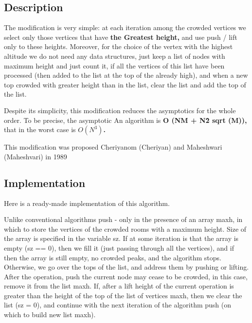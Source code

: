 \subsection{ Description }
The modification is very simple: at each iteration among the crowded vertices we select only those vertices that have \textbf{the Greatest height,} and use push / lift only to these heights. Moreover, for the choice of the vertex with the highest altitude we do not need any data structures, just keep a list of nodes with maximum height and just count it, if all the vertices of this list have been processed (then added to the list at the top of the already high), and when a new top crowded with greater height than in the list, clear the list and add the top of the list.

Despite its simplicity, this modification reduces the asymptotics for the whole order. To be precise, the asymptotic An algorithm is \textbf{O (NM + N\^2 sqrt (M)),} that in the worst case is \textbf{$O(N^3)$.}

This modification was proposed Cheriyanom (Cheriyan) and Maheshwari (Maheshvari) in 1989

\subsection{ Implementation }
Here is a ready-made implementation of this algorithm.

Unlike conventional algorithms push - only in the presence of an array maxh, in which to store the vertices of the crowded rooms with a maximum height. Size of the array is specified in the variable sz. If at some iteration is that the array is empty (sz == 0), then we fill it (just passing through all the vertices), and if then the array is still empty, no crowded peaks, and the algorithm stops. Otherwise, we go over the tops of the list, and address them by pushing or lifting. After the operation, push the current node may cease to be crowded, in this case, remove it from the list maxh. If, after a lift height of the current operation is greater than the height of the top of the list of vertices maxh, then we clear the list (sz = 0), and continue with the next iteration of the algorithm push (on which to build new list maxh).

